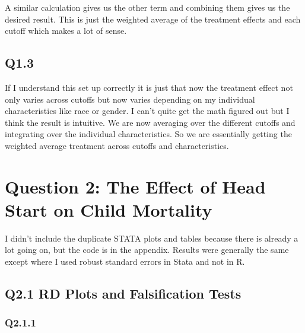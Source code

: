 \documentclass[11pt]{article}
\begin{document}
A similar calculation gives us the other term and combining them gives us the desired result. This is just the weighted average of the treatment effects and each cutoff which makes a lot of sense. 

\subsection{Q1.3}
If I understand this set up correctly it is just that now the treatment effect not only varies across cutoffs but now varies depending on my individual characteristics like race or gender. I can't quite get the math figured out but I think the result is intuitive. We are now averaging over the different cutoffs and integrating over the individual characteristics. So we are essentially getting the weighted average treatment across cutoffs and characteristics. 




\section{Question 2: The Effect of Head Start on Child Mortality}

I didn't include the duplicate STATA plots and tables because there is already a lot going on, but the code is in the appendix. Results were generally the same except where I used robust standard errors in Stata and not in R. 

\subsection{Q2.1 RD Plots and Falsification Tests}

\subsubsection{Q2.1.1}
\end{document}
